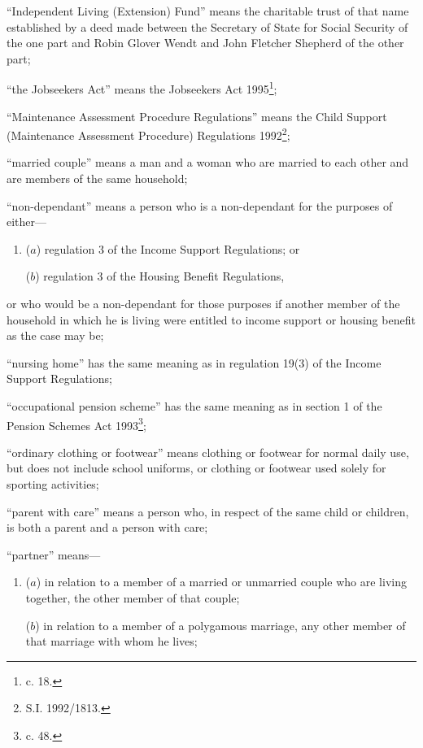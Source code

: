 \documentclass[12pt,a4paper]{article}
\begin{document}
\begin{enumerate}
“Independent Living (Extension) Fund” means the charitable trust of that name established by a deed made between the Secretary of State for Social Security of the one part and Robin Glover Wendt and John Fletcher Shepherd of the other part;

“the Jobseekers Act” means the Jobseekers Act 1995\footnote{ c. 18.};

“Maintenance Assessment Procedure Regulations” means the Child Support (Maintenance Assessment Procedure) Regulations 1992\footnote{\frenchspacing S.I. 1992/1813.};

“married couple” means a man and a woman who are married to each other and are members of the same household;

“non-dependant” means a person who is a non-dependant for the purposes of either—
\begin{enumerate}\item[]
($a$)
regulation 3 of the Income Support Regulations; or

($b$)
regulation 3 of the Housing Benefit Regulations,
\end{enumerate}
or who would be a non-dependant for those purposes if another member of the household in which he is living were entitled to income support or housing benefit as the case may be;

“nursing home” has the same meaning as in regulation 19(3) of the Income Support Regulations;

“occupational pension scheme” has the same meaning as in 
section 1 of the Pension Schemes Act 1993\footnote{ c. 48.};  %

“ordinary clothing or footwear” means clothing or footwear for normal daily use, but does not include school uniforms, or clothing or footwear used solely for sporting activities;

“parent with care” means a person who, in respect of the same child or children, is both a parent and a person with care;

“partner” means—
\begin{enumerate}\item[]
($a$)
in relation to a member of a married or unmarried couple who are living together, the other member of that couple;

($b$)
in relation to a member of a polygamous marriage, any other member of that marriage with whom he lives;
\end{enumerate}


\end{enumerate}
\end{document}
